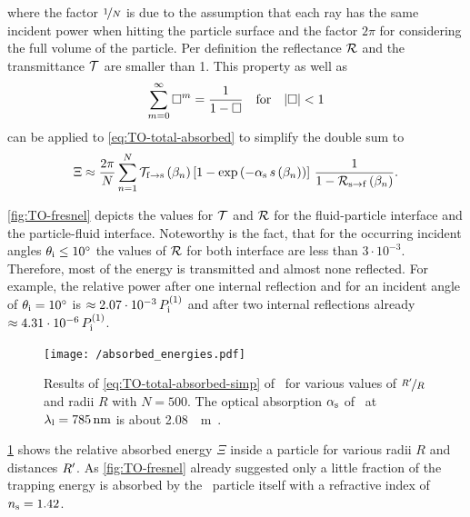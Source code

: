 where the factor $\nicefrac{1}{N}$ is due to the assumption that each ray has 
the same incident power when hitting the particle surface and the factor $2\pi$ 
for considering the full volume of the particle. Per definition the reflectance 
$\mathcal{R}$ and the transmittance $\mathcal{T}$ are smaller than 1. This property 
as well as
\begin{equation}
  \sum\limits^{\infty}_{m=0} \Box^{m} = \frac{1}{1-\Box}
  \quad\text{for}\quad\abs{\Box} < 1
\end{equation}
can be applied to \cref{eq:TO-total-absorbed} to simplify the double sum to
\begin{equation}
  \Xi \approx
  \frac{2\pi}{N}
  \sum\limits_{n=1}^{N}
  \mathcal{T}_{\mathrm{f}\rightarrow\mathrm{s}}\left( \beta_{n} \right)
  \left[ 1 - \exp\left( -\alpha_{\mathrm{s}}\,s\left( \beta_{n} \right) \right) 
  \right]
  \,\frac{1}{1-\mathcal{R}_{\mathrm{s}\rightarrow\mathrm{f}}\left( \beta_{n} \right)}.
  \label{eq:TO-total-absorbed-simp}
\end{equation}

\cref{fig:TO-fresnel} depicts the values for $\mathcal{T}$ and $\mathcal{R}$ for 
the fluid-particle interface and the particle-fluid interface. Noteworthy is 
the fact, that for the occurring incident angles $\theta_{\mathrm{i}} \leq 
\SI{10}{\degree}$ the values of $\mathcal{R}$ for both interface are less than 
$3\cdot 10^{-3}$. Therefore, most of the energy is transmitted and almost none 
reflected. For example, the relative power after one internal reflection and 
for an incident angle of $\theta_{\mathrm{i}}=\SI{10}{\degree}$ is $\approx 2.07\cdot 
10^{-3}\,P_{\mathrm{i}}^{(1)}$ and after two internal reflections already $\approx 
4.31\cdot 10^{-6}\,P_{\mathrm{i}}^{(1)}$.

\begin{figure}[tbp]
  \centering
  \texttt{[image: /absorbed\_energies.pdf]}
  \caption{Results of \cref{eq:TO-total-absorbed-simp} of \SiO~for various 
  values of $\nicefrac{R^{\prime}}{R}$ and radii $R$ with $N=500$. The optical 
absorption $\alpha_{\mathrm{s}}$ of \SiO~at $\lal=\SI{785}{\nm}$ is about 
\SI{2.08}{\per\meter}~\cite{Kitamura2007}.}
  \label{fig:TO-absorbed_energies}
\end{figure}

\cref{fig:TO-absorbed_energies} shows the relative absorbed energy $\Xi$ inside 
a particle for various radii $R$ and distances $R^{\prime}$. As 
\cref{fig:TO-fresnel} already suggested only a little fraction of the trapping 
energy is absorbed by the \SiO~particle itself with a refractive index of 
$n_{\mathrm{s}}=1.42$.

